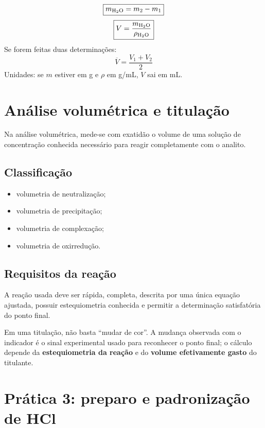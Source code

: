\documentclass[a4paper,12pt]{article}
\begin{document}
\begin{conta}
\[
\boxed{m_{\ce{H2O}} = m_2-m_1}
\]
\[
\boxed{V = \frac{m_{\ce{H2O}}}{\rho_{\ce{H2O}}}}
\]
Se forem feitas duas determinações:
\[
\boxed{\overline{V}=\frac{V_1+V_2}{2}}
\]
Unidades: se $m$ estiver em g e $\rho$ em g/mL, $V$ sai em mL.
\end{conta}

\section{Análise volumétrica e titulação}

Na análise volumétrica, mede-se com exatidão o volume de uma solução de concentração conhecida necessário para reagir completamente com o analito.

\subsection{Classificação}

\begin{itemize}[leftmargin=1.6em]
    \item volumetria de neutralização;
    \item volumetria de precipitação;
    \item volumetria de complexação;
    \item volumetria de oxirredução.
\end{itemize}

\subsection{Requisitos da reação}

A reação usada deve ser rápida, completa, descrita por uma única equação ajustada, possuir estequiometria conhecida e permitir a determinação satisfatória do ponto final.

\begin{memorize}
Em uma titulação, não basta ``mudar de cor''. A mudança observada com o indicador é o sinal experimental usado para reconhecer o ponto final; o cálculo depende da \textbf{estequiometria da reação} e do \textbf{volume efetivamente gasto} do titulante.
\end{memorize}

\section{Prática 3: preparo e padronização de HCl}
\end{document}
